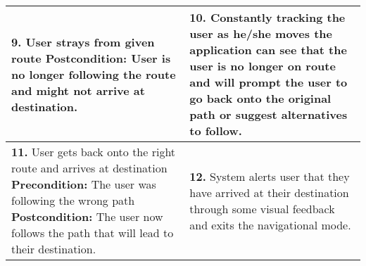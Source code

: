 \documentclass[a4paper,12pt]{article}
\begin{document}
\begin{table}[!htbp]
\begin{tabular}{|L|L|}
				\\
				\hline
				\textbf{9.} User strays from given route \linebreak \linebreak
				\textbf{Postcondition:} User is no longer following the route and might not arrive at destination.
				& \textbf{10.} Constantly tracking the user as he/she moves the application can see that the user is no longer on route and will prompt the user to go back onto the original path or suggest alternatives to follow. \linebreak \linebreak
				\\
				\hline
				\textbf{11.} User gets back onto the right route and arrives at destination \linebreak \linebreak
				\textbf{Precondition:} The user was following the wrong path \linebreak 
				\textbf{Postcondition:} The user now follows the path that will lead to their destination.
				& \textbf{12.} System alerts user that they have arrived at their destination through some visual feedback and exits the navigational mode. \linebreak
				\\
				\hline
				
				
			\end{tabular}
			\egroup
			
		\end{table}
\end{document}
